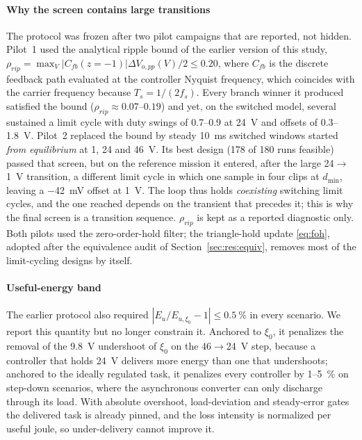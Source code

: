 \paragraph{Why the screen contains large transitions}
The protocol was frozen after two pilot campaigns that are reported, not
hidden. Pilot~1 used the analytical ripple bound of the earlier version of this
study, $\rho_{rip}=\max_V|C_{fb}(z{=}{-1})|\Delta V_{o,pp}(V)/2\le0.20$, where
$C_{fb}$ is the discrete feedback path evaluated at the controller Nyquist
frequency, which coincides with the carrier frequency because $T_s=1/(2f_s)$.
Every branch winner it produced satisfied the bound ($\rho_{rip}\approx0.07$--$0.19$)
and yet, on the switched model, several sustained a limit cycle with duty swings
of 0.7--0.9 at \SI{24}{V} and offsets of 0.3--\SI{1.8}{V}. Pilot~2 replaced the
bound by steady \SI{10}{ms} switched windows started \emph{from equilibrium} at
1, 24 and \SI{46}{V}. Its best design (178 of 180 runs feasible) passed that
screen, but on the reference mission it entered, after the large
24$\to$1~V transition, a different limit cycle in which one sample in four
clips at $d_{\min}$, leaving a \SI{-42}{mV} offset at \SI{1}{V}. The loop thus
holds \emph{coexisting} switching limit cycles, and the one reached depends on
the transient that precedes it; this is why the final screen is a transition
sequence. $\rho_{rip}$ is kept as a reported diagnostic only. Both pilots used
the zero-order-hold filter; the triangle-hold update \eqref{eq:foh}, adopted
after the equivalence audit of Section~\ref{sec:res:equiv}, removes most of the
limit-cycling designs by itself.

\paragraph{Useful-energy band} The earlier protocol also required
$|E_u/E_{u,\xi_0}-1|\le\SI{0.5}{\percent}$ in every scenario. We report this
quantity but no longer constrain it. Anchored to $\xi_0$, it penalizes the
removal of the \SI{9.8}{V} undershoot of $\xi_0$ on the 46$\to$24~V step,
because a controller that holds \SI{24}{V} delivers more energy than one that
undershoots; anchored to the ideally regulated task, it penalizes every
controller by 1--\SI{5}{\percent} on step-down scenarios, where the asynchronous
converter can only discharge through its load. With absolute overshoot,
load-deviation and steady-error gates the delivered task is already pinned,
and the loss intensity is normalized per useful joule, so under-delivery
cannot improve it.

